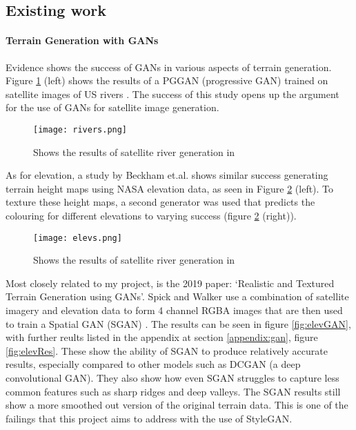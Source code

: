\documentclass[a4paper]{report}
\begin{document}
\subsection{Existing work}
\paragraph{Terrain Generation with GANs}
Evidence shows the success of GANs in various aspects of terrain generation. Figure \ref{fig:rivers} (left) shows the results of a PGGAN (progressive GAN) trained on satellite images of US rivers \cite{riverSat}. The success of this study opens up the argument for the use of GANs for satellite image generation.

\begin{figure}[H]
    \centering
        \texttt{[image: rivers.png]}
        \caption{Shows the results of satellite river generation in \cite{riverSat}}
        \label{fig:rivers}
\end{figure}

As for elevation, a study by Beckham et.al.\cite{beckham2017step} shows similar success generating terrain height maps using NASA elevation data, as seen in Figure \ref{fig:elevs} (left). To texture these height maps, a second generator was used that predicts the colouring for different elevations to varying success (figure \ref{fig:elevs} (right)).

\begin{figure}[H]
    \centering
        \texttt{[image: elevs.png]}
        \caption{Shows the results of satellite river generation in \cite{riverSat}}
        \label{fig:elevs}
\end{figure}

Most closely related to my project, is the 2019 paper: `Realistic and Textured Terrain Generation using GANs'. Spick and Walker use a combination of satellite imagery and elevation data to form 4 channel RGBA images that are then used to train a Spatial GAN (SGAN) \cite{ToDo}. The results can be seen in figure \ref{fig:elevGAN}, with further reults listed in the appendix at section \ref{appendix:gan}, figure \ref{fig:elevRes}. These show the ability of SGAN to produce relatively accurate results, especially compared to other models such as DCGAN (a deep convolutional GAN). They also show how even SGAN struggles to capture less common features such as sharp ridges and deep valleys. The SGAN results still show a more smoothed out version of the original terrain data. This is one of the failings that this project aims to address with the use of StyleGAN. 
\end{document}
